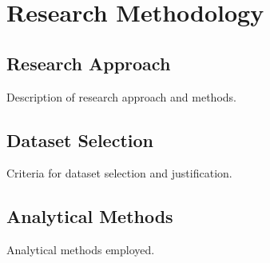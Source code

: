 \chapter{Research Methodology}
    \section{Research Approach}
        Description of research approach and methods.
    \section{Dataset Selection}
        Criteria for dataset selection and justification.
    \section{Analytical Methods}
        Analytical methods employed.